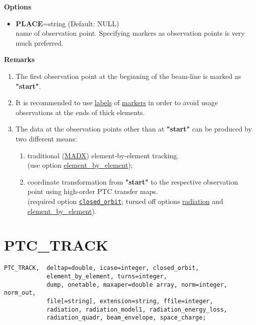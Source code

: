 {\bf Options}\\
\begin{itemize}
   \item {\bf PLACE}=string (Default: NULL) \\
     name of observation point. Specifying markers as observation points
     is very much preferred.
\end{itemize}

{\bf Remarks}\\
\begin{enumerate}
   \item The first observation point at the beginning of the beam-line
     is marked as \textbf{"start"}.  
       
   \item It is recommended to use
     \href{../Introduction/label.html}{labels} of
     \href{../Introduction/marker.html}{markers} in order to avoid usage
     observations at the ends of thick elements. 

   \item The data at the observation points other than at
     \textbf{"start"} can be produced by two different means: 
     \begin{enumerate}
        \item traditional (\href{../thintrack/thintrack.html}{MADX})
          element-by-element tracking.\\
          (use option \hyperlink{ELEMENT_BY_ELEMENT}{element\_by\_element}); 
       
        \item coordinate transformation from \textbf{"start"} to the
          respective observation point using high-order PTC transfer
          maps. \\
          (required option \texttt{\hyperlink{CLOSED_ORBIT}{closed\_orbit}}; 
          turned off options \hyperlink{RADIATION}{radiation} 
          and \hyperlink{ELEMENT_BY_ELEMENT}{element\_by\_element}).
     \end{enumerate} 
\end{enumerate}

\section{PTC\_TRACK}

\begin{verbatim}
PTC_TRACK,  deltap=double, icase=integer, closed_orbit, 
            element_by_element, turns=integer, 
            dump, onetable, maxaper=double array, norm=integer, norm_out, 
            file[=string], extension=string, ffile=integer, 
            radiation, radiation_model1, radiation_energy_loss, 
            radiation_quadr, beam_envelope, space_charge;
\end{verbatim}

